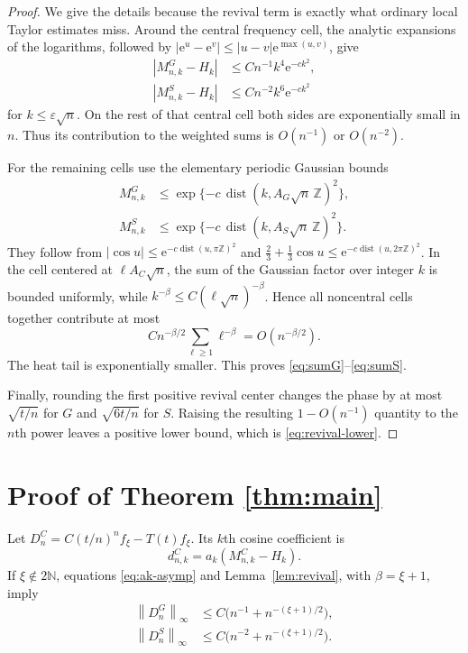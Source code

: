\documentclass[11pt,a4paper]{article}
\newcommand{\N}{\mathbb N}
\newcommand{\e}{\mathrm e}
\newcommand{\norm}[1]{\left\lVert#1\right\rVert_\infty}
\begin{document}
\begin{proof}
We give the details because the revival term is exactly what ordinary local
Taylor estimates miss.  Around the central frequency cell, the analytic
expansions of the logarithms, followed by
$|\e^u-\e^v|\le |u-v|\e^{\max(u,v)}$, give
\begin{align}
 |M^G_{n,k}-H_k|&\le Cn^{-1}k^4\e^{-ck^2},\\
 |M^S_{n,k}-H_k|&\le Cn^{-2}k^6\e^{-ck^2}
\end{align}
for $k\le\varepsilon\sqrt n$.  On the rest of that central cell both sides
are exponentially small in $n$.  Thus its contribution to the weighted sums
is $O(n^{-1})$ or $O(n^{-2})$.

For the remaining cells use the elementary periodic Gaussian bounds
\begin{align*}
 M^G_{n,k}&\le
 \exp\{-c\,\operatorname{dist}(k,A_G\sqrt n\,\mathbb Z)^2\},\\
 M^S_{n,k}&\le
 \exp\{-c\,\operatorname{dist}(k,A_S\sqrt n\,\mathbb Z)^2\}.
\end{align*}
They follow from $|\cos u|\le\e^{-c\operatorname{dist}(u,\pi\mathbb Z)^2}$
and
$\frac23+\frac13\cos u\le
\e^{-c\operatorname{dist}(u,2\pi\mathbb Z)^2}$.
In the cell centered at $\ell A_C\sqrt n$, the sum of the Gaussian factor
over integer $k$ is bounded uniformly, while
$k^{-\beta}\le C(\ell\sqrt n)^{-\beta}$.  Hence all noncentral cells together
contribute at most
\[
 Cn^{-\beta/2}\sum_{\ell\ge1}\ell^{-\beta}
 =O(n^{-\beta/2}).
\]
The heat tail is exponentially smaller.  This proves
\eqref{eq:sumG}--\eqref{eq:sumS}.

Finally, rounding the first positive revival center changes the phase by at
most $\sqrt{t/n}$ for $G$ and $\sqrt{6t/n}$ for $S$.  Raising the resulting
$1-O(n^{-1})$ quantity to the $n$th power leaves a positive lower bound,
which is \eqref{eq:revival-lower}.
\end{proof}

\section*{Proof of Theorem \ref{thm:main}}
Let $D^C_n=C(t/n)^nf_\xi-T(t)f_\xi$.  Its $k$th cosine coefficient is
\begin{equation}\label{eq:error-coeff}
 d^C_{n,k}=a_k(M^C_{n,k}-H_k).
\end{equation}
If $\xi\notin2\N$, equations \eqref{eq:ak-asymp} and
Lemma~\ref{lem:revival}, with $\beta=\xi+1$, imply
\begin{align}
 \norm{D^G_n}&\le C\bigl(n^{-1}+n^{-(\xi+1)/2}\bigr),\label{eq:upperG}\\
 \norm{D^S_n}&\le C\bigl(n^{-2}+n^{-(\xi+1)/2}\bigr).
 \label{eq:upperS}
\end{align}
\end{document}
